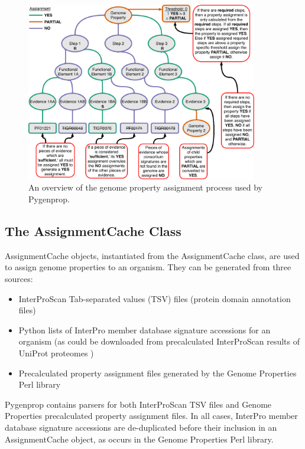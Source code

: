\begin{figure}[!ht]
  \centering
	\includegraphics[width=0.90\textwidth]{media/Pygenprop_Assignment.pdf}
	 \caption{An overview of the genome property assignment process used by Pygenprop.}
	 \label{fig:propertyassignment}
\end{figure}

\subsection{The AssignmentCache Class} \label{AssignmentCache}

AssignmentCache objects, instantiated from the AssignmentCache class, are used to assign genome properties to an organism. They can be generated from three sources: 
\begin{itemize}
\item InterProScan Tab-separated values (TSV) files (protein domain annotation files) 
\item Python lists of InterPro member database signature accessions for an organism (as could be downloaded from precalculated InterProScan results of UniProt proteomes \cite{uniprot2014uniprot})
\item Precalculated property assignment files generated by the Genome Properties Perl library
\end{itemize}
Pygenprop contains parsers for both InterProScan TSV files and Genome Properties precalculated property assignment files. In all cases, InterPro member database signature accessions are de-duplicated before their inclusion in an AssignmentCache object, as occurs in the Genome Properties Perl library.

